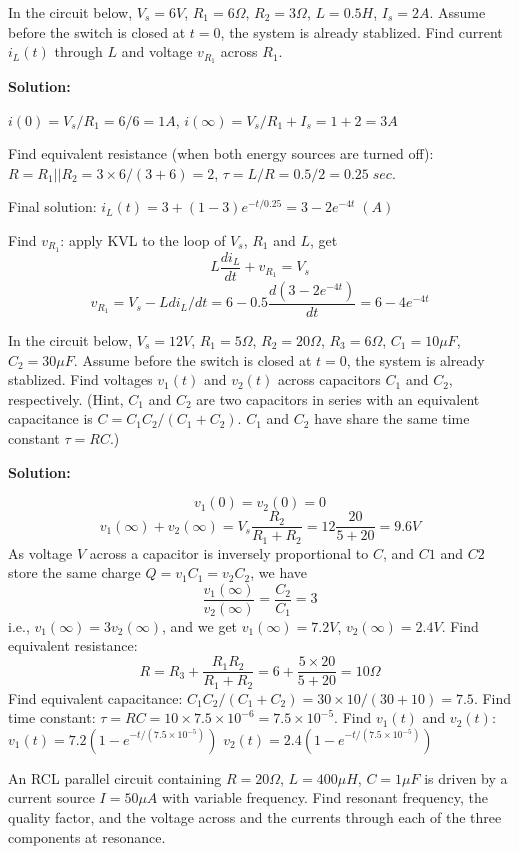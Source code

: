 \item In the circuit below, $V_s=6V$, $R_1=6\Omega$, $R_2=3\Omega$,
$L=0.5H$, $I_s=2A$. Assume before the switch is closed at $t=0$, the
system is already stablized. Find current $i_L(t)$ through $L$ and 
voltage $v_{R_1}$ across $R_1$.


{\bf Solution:}

 $i(0)=V_s/R_1=6/6=1A$, $i(\infty)=V_s/R_1+I_s=1+2=3A$

 Find equivalent resistance (when both energy sources are turned off):
 $R=R_1 || R_2=3\times 6/(3+6)=2$, $\tau=L/R=0.5/2=0.25\;sec.$

 Final solution:
 $i_L(t)=3+(1-3)e^{-t/0.25}=3-2 e^{-4t} \; (A)$

 Find $v_{R_1}$: apply KVL to the loop of $V_s$, $R_1$ and $L$, get
 \[ L\frac{di_L}{dt}+v_{R_1}=V_s	\]
 \[ v_{R_1}=V_s-L di_L/dt=6-0.5 \frac{d(3-2 e^{-4t})}{dt}=6-4e^{-4t}	\]

\item In the circuit below, $V_s=12V$, $R_1=5\Omega$, $R_2=20\Omega$,
$R_3=6\Omega$, $C_1=10\mu F$, $C_2=30\mu F$. Assume before the switch 
is closed at $t=0$, the system is already stablized. Find voltages
$v_1(t)$ and $v_2(t)$ across capacitors $C_1$ and $C_2$, respectively.
(Hint, $C_1$ and $C_2$ are two capacitors in series with an equivalent
capacitance is $C=C_1 C_2/(C_1+C_2)$. $C_1$ and $C_2$ have share the same
time constant $\tau=RC$.)


{\bf Solution:}

 \[ v_1(0)=v_2(0)=0	\]
 \[ v_1(\infty)+v_2(\infty)=V_s \frac{R_2}{R_1+R_2}
 	=12 \frac{20}{5+20}=9.6V	\]
 As voltage $V$ across a capacitor is inversely proportional to $C$, and 
 $C1$ and $C2$ store the same charge $Q=v_1C_1=v_2C_2$, we have
 \[	\frac{v_1(\infty)}{v_2(\infty)}=\frac{C_2}{C_1}=3	\]
 i.e., $v_1(\infty)=3v_2(\infty)$, and we get $v_1(\infty)=7.2V$,
 $v_2(\infty)=2.4V$.
 Find equivalent resistance: 
 \[ R=R_3+\frac{R_1 R_2}{R_1+R_2}=6+\frac{5\times 20}{5+20}=10\Omega \]
 Find equivalent capacitance: $C_1 C_2/(C_1+C_2)=30\times 10/(30+10)=7.5$. 
 Find time constant: $\tau=RC=10\times 7.5\times 10^{-6}=7.5\times 10^{-5}$.
 Find $v_1(t)$ and $v_2(t)$:
 $v_1(t)=7.2(1-e^{-t/(7.5\times 10^{-5})})$
 $v_2(t)=2.4(1-e^{-t/(7.5\times 10^{-5})})$

\item An RCL parallel circuit containing $R=20\Omega$, $L=400 \mu H$,
$C=1 \mu F$ is driven by a current source $I=50 \mu A$ with variable 
frequency. Find resonant frequency, the quality factor, and the voltage
across and the currents through each of the three components at resonance.

